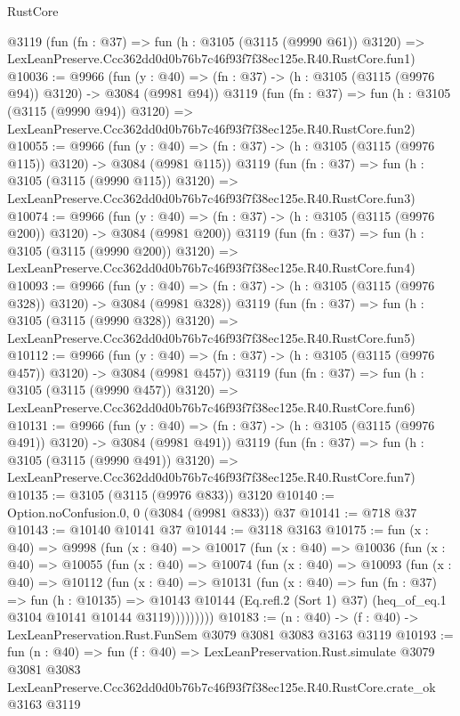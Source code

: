 \begin{lexlean}{RustCore}
\begin{coremodule}
    @3119
    (fun (fn : @37) =>
    fun (h : @3105 (@3115 (@9990 @61)) @3120) =>
    LexLeanPreserve.Ccc362dd0d0b76b7c46f93f7f38ec125e.R40.RustCore.fun1)
@10036 := @9966
    (fun (y : @40) => (fn : @37) -> (h : @3105 (@3115 (@9976 @94)) @3120) -> @3084 (@9981 @94))
    @3119
    (fun (fn : @37) =>
    fun (h : @3105 (@3115 (@9990 @94)) @3120) =>
    LexLeanPreserve.Ccc362dd0d0b76b7c46f93f7f38ec125e.R40.RustCore.fun2)
@10055 := @9966
    (fun (y : @40) => (fn : @37) -> (h : @3105 (@3115 (@9976 @115)) @3120) -> @3084 (@9981 @115))
    @3119
    (fun (fn : @37) =>
    fun (h : @3105 (@3115 (@9990 @115)) @3120) =>
    LexLeanPreserve.Ccc362dd0d0b76b7c46f93f7f38ec125e.R40.RustCore.fun3)
@10074 := @9966
    (fun (y : @40) => (fn : @37) -> (h : @3105 (@3115 (@9976 @200)) @3120) -> @3084 (@9981 @200))
    @3119
    (fun (fn : @37) =>
    fun (h : @3105 (@3115 (@9990 @200)) @3120) =>
    LexLeanPreserve.Ccc362dd0d0b76b7c46f93f7f38ec125e.R40.RustCore.fun4)
@10093 := @9966
    (fun (y : @40) => (fn : @37) -> (h : @3105 (@3115 (@9976 @328)) @3120) -> @3084 (@9981 @328))
    @3119
    (fun (fn : @37) =>
    fun (h : @3105 (@3115 (@9990 @328)) @3120) =>
    LexLeanPreserve.Ccc362dd0d0b76b7c46f93f7f38ec125e.R40.RustCore.fun5)
@10112 := @9966
    (fun (y : @40) => (fn : @37) -> (h : @3105 (@3115 (@9976 @457)) @3120) -> @3084 (@9981 @457))
    @3119
    (fun (fn : @37) =>
    fun (h : @3105 (@3115 (@9990 @457)) @3120) =>
    LexLeanPreserve.Ccc362dd0d0b76b7c46f93f7f38ec125e.R40.RustCore.fun6)
@10131 := @9966
    (fun (y : @40) => (fn : @37) -> (h : @3105 (@3115 (@9976 @491)) @3120) -> @3084 (@9981 @491))
    @3119
    (fun (fn : @37) =>
    fun (h : @3105 (@3115 (@9990 @491)) @3120) =>
    LexLeanPreserve.Ccc362dd0d0b76b7c46f93f7f38ec125e.R40.RustCore.fun7)
@10135 := @3105 (@3115 (@9976 @833)) @3120
@10140 := Option.noConfusion.{0, 0} (@3084 (@9981 @833)) @37
@10141 := @718 @37
@10143 := @10140 @10141 @37
@10144 := @3118 @3163
@10175 := fun (x : @40) =>
  @9998
    (fun (x : @40) =>
    @10017
      (fun (x : @40) =>
      @10036
        (fun (x : @40) =>
        @10055
          (fun (x : @40) =>
          @10074
            (fun (x : @40) =>
            @10093
              (fun (x : @40) =>
              @10112
                (fun (x : @40) =>
                @10131
                  (fun (x : @40) =>
                  fun (fn : @37) =>
                  fun (h : @10135) =>
                  @10143
                    @10144
                    (Eq.refl.{2} (Sort 1) @37)
                    (heq_of_eq.{1} @3104 @10141 @10144 @3119)))))))))
@10183 := (n : @40) -> (f : @40) -> LexLeanPreservation.Rust.FunSem @3079 @3081 @3083 @3163 @3119
@10193 := fun (n : @40) =>
  fun (f : @40) =>
  LexLeanPreservation.Rust.simulate
    @3079
    @3081
    @3083
    LexLeanPreserve.Ccc362dd0d0b76b7c46f93f7f38ec125e.R40.RustCore.crate_ok
    @3163
    @3119
\end{coremodule}
\end{lexlean}
